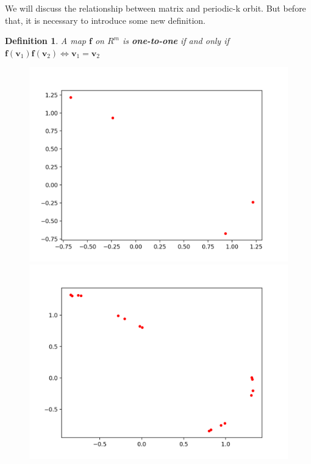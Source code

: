 \documentclass[12pt]{article}
\theoremstyle{plain}
\newtheorem{definition}{\textbf{Definition}}[section]
\begin{document}
We will discuss the relationship between matrix and periodic-k orbit. But before that, it is necessary to introduce some new definition.

\begin{definition} A map $\mathbf f$ on $R^m$ is \textbf{one-to-one} if and only if $\mathbf f(\mathbf v_1) \mathbf f(\mathbf v_2) \Leftrightarrow \mathbf v_1 = \mathbf v_2$
\end{definition}





\begin{figure}[H]
\begin{minipage}[c][0.32\width]{0.32\textwidth}
   \centering
   \includegraphics[width=\textwidth]{figure/section2/Henon-attractor-0*9-0*4.png}
\end{minipage}
\begin{minipage}[c][0.32\width]{0.32\textwidth}
   \centering
   \includegraphics[width=\textwidth]{figure/section2/Henon-attractor-0*988-0*4.png}

\end{minipage}
\end{figure}
\end{document}
